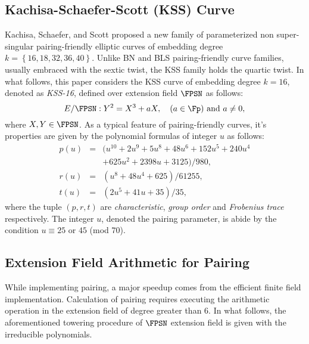 \subsection{Kachisa-Schaefer-Scott (KSS) Curve \cite{kss}}
Kachisa, Schaefer, and Scott proposed a new family of  parameterized non super-singular pairing-friendly elliptic curves of embedding degree $k = \left\lbrace 16, 18, 32, 36, 40\right\rbrace$.
Unlike BN and BLS pairing-friendly curve families, usually embraced with the sextic twist, the KSS family  holds the quartic twist. 
In what follows, this paper considers  the KSS curve of embedding degree $k =16$, denoted as \textit{KSS-16}, defined over extension field $\FPSN$ as follows:
\begin{equation}\label{eq:KSS_16}
E/\FPSN:Y^2=X^3+aX, \quad \mbox{($a \in \Fp$) and  $a \neq 0$},
\end{equation}
where $X,Y \in \FPSN$. 
As a typical feature of pairing-friendly curves, it's properties are given by the polynomial formulas of integer $u$ as follows:
\begin{subequations}
	\begin{eqnarray}
	p(u) &= & (u^{10} +2u^9 +5u^8 +48u^6 +152u^5 +240u^4   \nonumber \\ 
	&& +625u^2 +2398u +3125)/980,  \\\label{eq:kss_16_char}
	r(u) &= & (u^8 +48u^4 +625)/61255, \label{eq:kss_16_degree}  \\
	t(u) &=& (2u^5 +41u+35)/35, \label{eq:kss_16_trace} 
	\end{eqnarray}
\end{subequations} 
where the tuple $(p,r,t)$ are \textit{characteristic}, \textit{group order} and \textit{Frobenius trace} respectively.
The integer  $u$, denoted the pairing parameter, is abide by the condition $u \equiv 25$ or $45$ (mod $70$). 

\subsection{Extension Field Arithmetic for Pairing}
While implementing pairing, a major speedup comes from the efficient finite field implementation. 
Calculation of pairing requires executing the arithmetic operation in the extension field {of degree greater than 6}\cite{const_ext}.
In what follows, the aforementioned towering procedure of  $\FPSN$ extension field is given with the irreducible polynomials.

